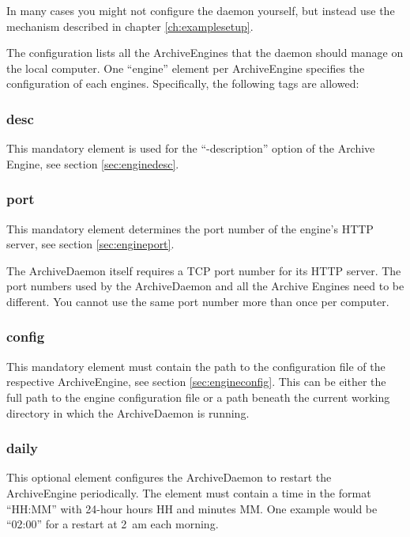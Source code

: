 In many cases you might not configure the daemon yourself,
but instead use the mechanism described in chapter \ref{ch:examplesetup}.





\noindent The configuration lists all the
ArchiveEngines that the daemon should manage on the local
computer. One ``engine'' element per ArchiveEngine specifies the
configuration of each engines. Specifically, the following tags are
allowed:

\subsubsection{desc}
This mandatory element is used for the ``-description'' option of the
Archive Engine, see section \ref{sec:enginedesc}.

\subsubsection{port}
This mandatory element determines the port number of the engine's HTTP
server, see section \ref{sec:engineport}.

\NOTE The ArchiveDaemon itself requires a TCP port number for its HTTP
server. The port numbers used by the ArchiveDaemon and all the Archive
Engines need to be different. You cannot use the same port number more
than once per computer.

\subsubsection{config}
This mandatory element must contain the path to the configuration
file of the respective ArchiveEngine, see section \ref{sec:engineconfig}.
This can be either the full path to the engine configuration file or a path
beneath the current working directory in which the ArchiveDaemon is running.

\subsubsection{daily}
This optional element configures the ArchiveDaemon to restart the
ArchiveEngine periodically. The element must contain a time in the
format ``HH:MM'' with 24-hour hours HH and minutes MM. One example
would be ``02:00'' for a restart at 2~am each morning.

